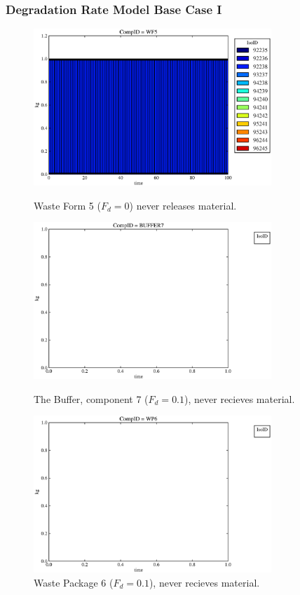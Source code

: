 \begin{frame}
  \frametitle{Degradation Rate Model Base Case I}
  \begin{figure}

\begin{minipage}[b]{0.45\linewidth}

  \includegraphics[width=0.8\textwidth]{./images/drI1.eps}
  \caption[DRI Waste Form Contaminants.]{
    Waste Form 5 ($F_d = 0$) never releases material.
    }
  \label{fig:drIwf5}
  
  \includegraphics[width=0.8\textwidth]{./images/drI3.eps}
  \caption[Case DRI Buffer Contaminants]{
    The Buffer, component 7 ($F_d = 0.1$), never recieves material.
    }
  \label{fig:drIbuff}

\end{minipage}
\hspace{0.05\linewidth}
\begin{minipage}[b]{0.45\linewidth}
  \includegraphics[width=0.8\textwidth]{./images/drI2.eps}
  \caption[Case DRI Waste Package Contaminants.]{ 
    Waste Package 6 ($F_d = 0.1$), never recieves material.
    }
  \label{fig:drIwp6}


\end{minipage}
\end{figure}
\end{frame}

